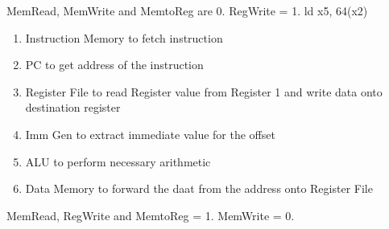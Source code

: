 \documentclass[addpoints]{exam}
\begin{document}
\begin{sloppypar}
\begin{questions}
\begin{solution}
\begin{parts}
\begin{subparts}
                MemRead, MemWrite and MemtoReg are 0. RegWrite = 1. 
                \subpart ld x5, 64(x2) \begin{enumerate}
                    \item Instruction Memory to fetch instruction 
                    \item PC to get address of the instruction 
                    \item Register File to read Register value from Register 1 and write data onto destination register
                    \item Imm Gen to extract immediate value for the offset 
                    \item ALU to perform necessary arithmetic
                    \item Data Memory to forward the daat from the address onto Register File 
                \end{enumerate} 
                MemRead, RegWrite and MemtoReg = 1. MemWrite = 0.

\end{subparts}
\end{parts}
\end{solution}
\end{questions}
\end{sloppypar}
\end{document}
